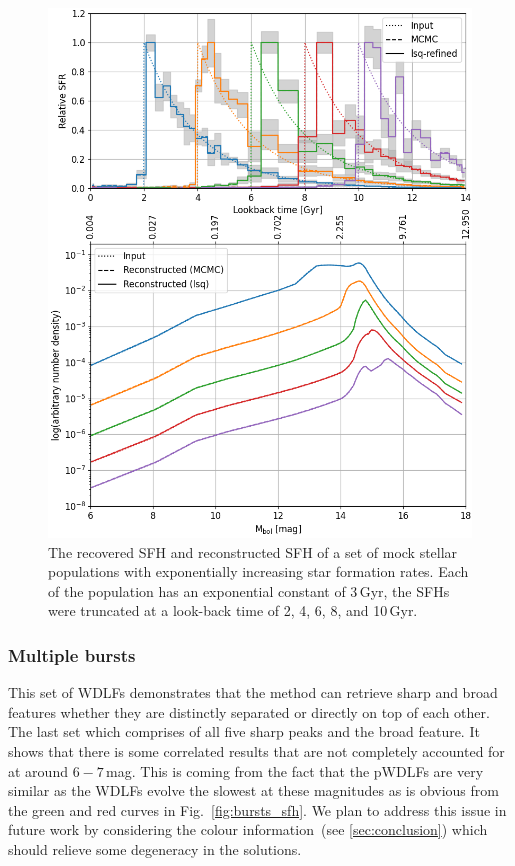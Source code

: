 \documentclass[fleqn,usenatbib]{mnras}
\begin{document}
\begin{figure}
  \includegraphics[width=\columnwidth]{figures/fig_01_exponential_decay_wdlf.png}
  \caption{The recovered SFH and reconstructed SFH of a set of mock stellar
  populations with exponentially increasing star formation rates. Each of
  the population has an exponential constant of 3\,Gyr, the SFHs were truncated at
  a look-back time of 2, 4, 6, 8, and 10\,Gyr.}
  \label{fig:exponential_sfh}
\end{figure}

\subsubsection*{Multiple bursts}
This set of WDLFs demonstrates that the method can retrieve sharp and
broad features whether they are distinctly separated or directly on top of each
other. The last set which comprises of all five sharp peaks and the broad
feature. It shows that there is some correlated results that are not completely
accounted for at around $6-7$\,mag. This is coming from the fact that the
pWDLFs are very similar as the WDLFs evolve the slowest at these magnitudes as
is obvious from the green and red curves in Fig.~\ref{fig:bursts_sfh}. We plan
to address this issue in future work by considering the colour
information~(see \ref{sec:conclusion}) which should relieve some degeneracy in
the solutions.
\end{document}
